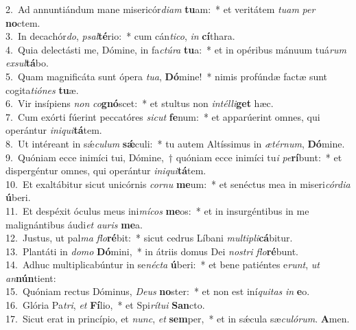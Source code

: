 {2.~}Ad annuntiándum mane misericór\textit{di}\textit{am} \textbf{tu}am:~* et veritátem \textit{tu}\textit{am} \textit{per} \textbf{no}ctem.\\
{3.~}In decachór\textit{do}, \textit{psal}\textbf{té}rio:~* cum cán\textit{ti}\textit{co}, \textit{in} \textbf{cí}thara.\\
{4.~}Quia delectásti me, Dómine, in fa\textit{ctú}\textit{ra} \textbf{tu}a:~* et in opéribus mánuum tuá\textit{rum} \textit{ex}\textit{sul}\textbf{tá}bo.\\
{5.~}Quam magnificáta sunt ópera \textit{tu}\textit{a}, \textbf{Dó}mine!~* nimis profúndæ factæ sunt cogita\textit{ti}\textit{ó}\textit{nes} \textbf{tu}æ.\\
{6.~}Vir insípiens \textit{non} \textit{co}\textbf{gnó}scet:~* et stultus non \textit{in}\textit{tél}\textit{li}\textbf{get} hæc.\\
{7.~}Cum exórti fúerint peccatóres \textit{si}\textit{cut} \textbf{fe}num:~* et apparúerint omnes, qui operántur \textit{i}\textit{ni}\textit{qui}\textbf{tá}tem.\\
{8.~}Ut intéreant in sǽ\textit{cu}\textit{lum} \textbf{sǽ}culi:~* tu autem Altíssimus in \textit{æ}\textit{tér}\textit{num}, \textbf{Dó}mine.\\
{9.~}Quóniam ecce inimíci tui, Dómine,~† quóniam ecce inimíci tu\textit{i} \textit{pe}\textbf{rí}bunt:~* et dispergéntur omnes, qui operántur \textit{i}\textit{ni}\textit{qui}\textbf{tá}tem.\\
{10.~}Et exaltábitur sicut unicórnis \textit{cor}\textit{nu} \textbf{me}um:~* et senéctus mea in miseri\textit{cór}\textit{di}\textit{a} \textbf{ú}beri.\\
{11.~}Et despéxit óculus meus ini\textit{mí}\textit{cos} \textbf{me}os:~* et in insurgéntibus in me malignántibus áudi\textit{et} \textit{au}\textit{ris} \textbf{me}a.\\
{12.~}Justus, ut pal\textit{ma} \textit{flo}\textbf{ré}bit:~* sicut cedrus Líbani \textit{mul}\textit{ti}\textit{pli}\textbf{cá}bitur.\\
{13.~}Plantáti in \textit{do}\textit{mo} \textbf{Dó}mini,~* in átriis domus Dei \textit{no}\textit{stri} \textit{flo}\textbf{ré}bunt.\\
{14.~}Adhuc multiplicabúntur in se\textit{né}\textit{cta} \textbf{ú}beri:~* et bene patiéntes e\textit{runt}, \textit{ut} \textit{an}\textbf{nún}tient:\\
{15.~}Quóniam rectus Dóminus, \textit{De}\textit{us} \textbf{no}ster:~* et non est iní\textit{qui}\textit{tas} \textit{in} \textbf{e}o.\\
{16.~}Glória Pa\textit{tri}, \textit{et} \textbf{Fí}lio,~* et Spi\textit{rí}\textit{tu}\textit{i} \textbf{San}cto.\\
{17.~}Sicut erat in princípio, et \textit{nunc}, \textit{et} \textbf{sem}per,~* et in sǽcula sæ\textit{cu}\textit{ló}\textit{rum}. \textbf{A}men.\\
